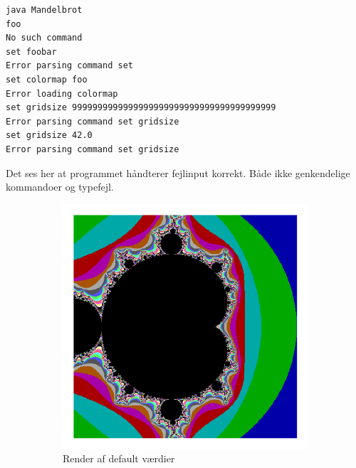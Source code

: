 \begin{lstlisting}[caption=fejlinput i mandelbrot konsol]
java Mandelbrot
foo
No such command
set foobar
Error parsing command set
set colormap foo
Error loading colormap
set gridsize 9999999999999999999999999999999999999999
Error parsing command set gridsize
set gridsize 42.0
Error parsing command set gridsize
\end{lstlisting}
Det ses her at programmet håndterer fejlinput korrekt. Både ikke genkendelige kommandoer og typefejl.
\begin{figure}
    \centering
    \begin{subfigure}[b]{0.3\textwidth}
        \centering
        \includegraphics[width=\textwidth]{pictures/M0.png}
        \caption{ Render af default værdier }
    \end{subfigure}
    \begin{subfigure}[b]{0.3\textwidth}
        \centering

\end{subfigure}
\end{figure}
